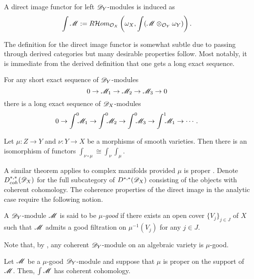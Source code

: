 \begin{remark}
  A direct image functor for left $\mathscr{D}_Y$-modules is induced as  $$\int\mathscr{M} := R\mathcal{H}om_{\mathcal{O}_X}\left(\omega_X,\int (\mathscr{M}\otimes_{\mathcal{O}_Y} \omega_Y)\right).$$
\end{remark}
The definition for the direct image functor is somewhat subtle due to passing through derived categories but many desirable properties follow.
Most notably, it is immediate from the derived definition that one gets a long exact sequence.
\begin{proposition}
    For any short exact sequence of $\mathscr{D}_Y$-modules
    $$0 \to \mathscr{M}_1 \to \mathscr{M}_2 \to \mathscr{M}_3 \to 0 $$
    there is a long exact sequence of $\mathscr{D}_X$-modules
    $$0 \to \int^0 \mkern -8mu\mathscr{M}_1 \to\int^0 \mkern -8mu \mathscr{M}_2 \to \int^0 \mkern -8mu \mathscr{M}_3 \to \int^1 \mkern -8mu \mathscr{M}_1 \to \cdots.$$
\end{proposition}
\begin{proposition}{\cite[Chapter VI, Section 5]{borel1987algebraic}}
  Let $\mu:Z\to Y$ and $\nu:Y\to X$ be a morphisms of smooth varieties.
  Then there is an isomorphism of functors $\int_{\nu\circ \mu} \cong \int_\nu \int_\mu$.
\end{proposition}
A similar theorem applies to complex manifolds provided $\mu$ is proper \cite[Theorem 3.3.6]{sabbah2011introduction}.
Denote $D_{coh}^{*,*}(\mathscr{D}_X)$ for the full subcategory of $D^{*,*}(\mathscr{D}_X)$ consisting of the objects with coherent cohomology.
The coherence properties of the direct image in the analytic case require the following notion.
\begin{definition}
  A $\mathscr{D}_Y$-module $\mathscr{M}$ is said to be {\it $\mu$-good} if there exists an open cover $\{V_j\}_{j\in J}$ of $X$ such that $\mathscr{M}$ admits a good filtration on $\mu^{-1}(V_j)$ for any $j\in J$.
\end{definition}
Note that, by , any coherent $\mathscr{D}_Y$-module on an algebraic variety is $\mu$-good.
\begin{theorem}{\cite[Theorem 3.4.1.]{sabbah2011introduction}}\label{thm: MuGoodCoherent}
  Let $\mathscr{M}$ be a $\mu$-good $\mathscr{D}_Y$-module and suppose that $\mu$ is proper on the support of $\mathscr{M}$.
  Then, $\int \mathscr{M}$ has coherent cohomology.
\end{theorem}
